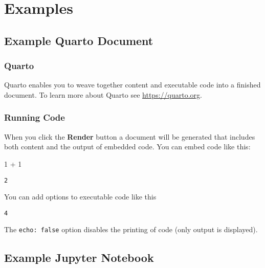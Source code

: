 \documentclass[
  letterpaper,
  DIV=11,
  numbers=noendperiod]{scrreprt}
\newenvironment{Shaded}{\begin{snugshade}}{\end{snugshade}}
\newcommand{\DecValTok}[1]{\textcolor[rgb]{0.68,0.00,0.00}{#1}}
\newcommand{\OperatorTok}[1]{\textcolor[rgb]{0.37,0.37,0.37}{#1}}
\begin{document}
\part{Examples}

\hypertarget{example-quarto-document}{%
\chapter{Example Quarto Document}\label{example-quarto-document}}

\hypertarget{quarto}{%
\section{Quarto}\label{quarto}}

Quarto enables you to weave together content and executable code into a
finished document. To learn more about Quarto see
\url{https://quarto.org}.

\hypertarget{running-code}{%
\section{Running Code}\label{running-code}}

When you click the \textbf{Render} button a document will be generated
that includes both content and the output of embedded code. You can
embed code like this:

\begin{Shaded}
\begin{Highlighting}[]
\DecValTok{1} \OperatorTok{+} \DecValTok{1}
\end{Highlighting}
\end{Shaded}

\begin{verbatim}
2
\end{verbatim}

You can add options to executable code like this

\begin{verbatim}
4
\end{verbatim}

The \texttt{echo:\ false} option disables the printing of code (only
output is displayed).

\hypertarget{example-jupyter-notebook}{%
\chapter{Example Jupyter Notebook}\label{example-jupyter-notebook}}
\end{document}
